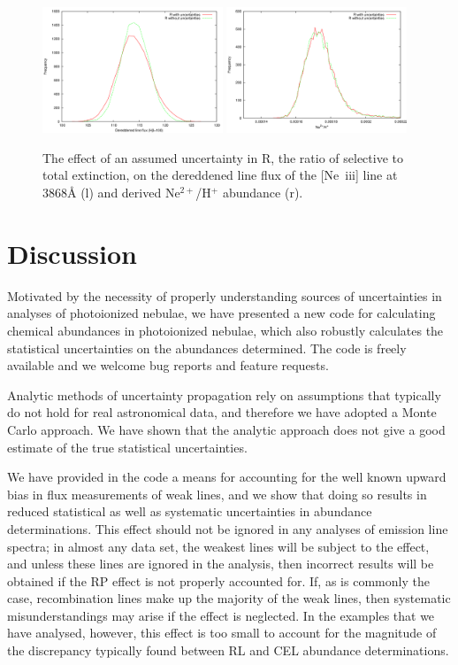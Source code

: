 \documentclass[useAMS,usenatbib]{mn2e}
\begin{document}
\begin{figure}
\includegraphics[width=0.48\textwidth]{figures/Reffect_flux.png}
\includegraphics[width=0.48\textwidth]{figures/Reffect_abundance.png}
\caption{The effect of an assumed uncertainty in R, the ratio of selective to total extinction, on the dereddened line flux of the [Ne~{\sc iii}] line at 3868{\AA} (l) and derived Ne$^{2+}$/H$^+$ abundance (r).} 
\label{R_effect}
\end{figure}

\section{Discussion}

Motivated by the necessity of properly understanding sources of uncertainties in analyses of photoionized nebulae, we have presented a new code for calculating chemical abundances in photoionized nebulae, which also robustly calculates the statistical uncertainties on the abundances determined.  The code is freely available and we welcome bug reports and feature requests.

Analytic methods of uncertainty propagation rely on assumptions that typically do not hold for real astronomical data, and therefore we have adopted a Monte Carlo approach.  We have shown that the analytic approach does not give a good estimate of the true statistical uncertainties.

We have provided in the code a means for accounting for the well known upward bias in flux measurements of weak lines, and we show that doing so results in reduced statistical as well as systematic uncertainties in abundance determinations.  This effect should not be ignored in any analyses of emission line spectra; in almost any data set, the weakest lines will be subject to the effect, and unless these lines are ignored in the analysis, then incorrect results will be obtained if the RP effect is not properly accounted for.  If, as is commonly the case, recombination lines make up the majority of the weak lines, then systematic misunderstandings may arise if the effect is neglected.  In the examples that we have analysed, however, this effect is too small to account for the magnitude of the discrepancy typically found between RL and CEL abundance determinations.
\end{document}
